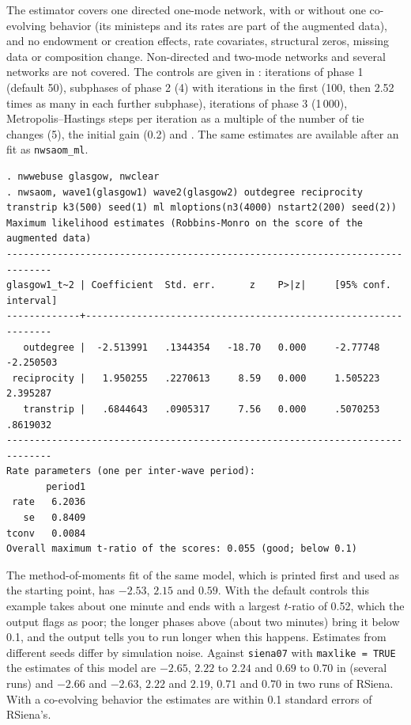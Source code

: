 The estimator covers one directed one-mode network, with or without one co-evolving behavior (its ministeps and its rates are part of the augmented data), and no endowment or creation effects, rate covariates, structural zeros, missing data or composition change. Non-directed and two-mode networks and several networks are not covered. The controls are given in :  iterations of phase 1 (default 50),  subphases of phase 2 (4) with  iterations in the first (100, then 2.52 times as many in each further subphase),  iterations of phase 3 (1\,000),  Metropolis--Hastings steps per iteration as a multiple of the number of tie changes (5),  the initial gain (0.2) and . The same estimates are available after an \nwsaom{} fit as \texttt{nwsaom\_ml}.
\begin{lstlisting}
. nwwebuse glasgow, nwclear
. nwsaom, wave1(glasgow1) wave2(glasgow2) outdegree reciprocity transtrip k3(500) seed(1) ml mloptions(n3(4000) nstart2(200) seed(2))
Maximum likelihood estimates (Robbins-Monro on the score of the augmented data)
------------------------------------------------------------------------------
glasgow1_t~2 | Coefficient  Std. err.      z    P>|z|     [95% conf. interval]
-------------+----------------------------------------------------------------
   outdegree |  -2.513991   .1344354   -18.70   0.000     -2.77748   -2.250503
 reciprocity |   1.950255   .2270613     8.59   0.000     1.505223    2.395287
   transtrip |   .6844643   .0905317     7.56   0.000     .5070253    .8619032
------------------------------------------------------------------------------
Rate parameters (one per inter-wave period):
       period1
 rate   6.2036
   se   0.8409
tconv   0.0084
Overall maximum t-ratio of the scores: 0.055 (good; below 0.1)
\end{lstlisting}
The method-of-moments fit of the same model, which is printed first and used as the starting point, has $-2.53$, $2.15$ and $0.59$. With the default controls this example takes about one minute and ends with a largest $t$-ratio of 0.52, which the output flags as poor; the longer phases above (about two minutes) bring it below 0.1, and the output tells you to run longer when this happens. Estimates from different seeds differ by simulation noise. Against \texttt{siena07} with \texttt{maxlike = TRUE} the estimates of this model are $-2.65$, $2.22$ to $2.24$ and $0.69$ to $0.70$ in \nwsaom{} (several runs) and $-2.66$ and $-2.63$, $2.22$ and $2.19$, $0.71$ and $0.70$ in two runs of RSiena. With a co-evolving behavior the estimates are within 0.1 standard errors of RSiena's.

